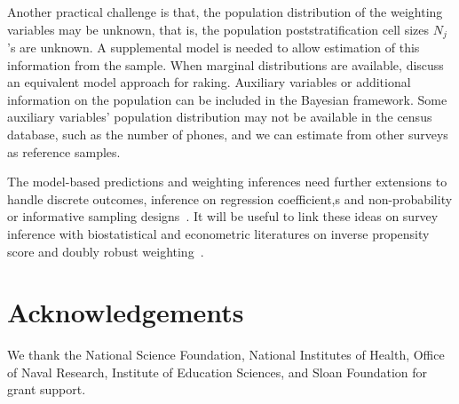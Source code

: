 \documentclass[11pt]{article}
\numberwithin{figure}{section}
\numberwithin{table}{section}
\numberwithin{equation}{section}
\begin{document}
Another practical challenge is that, the population distribution of the
weighting variables may be unknown, that is, the population poststratification
cell sizes $N_j$'s are unknown. A supplemental model is needed to allow
estimation of this information from the sample. When marginal distributions are
available, \cite{rake:little91} discuss an equivalent model approach for
raking. Auxiliary variables or additional information on the population can be
included in the Bayesian framework. Some auxiliary variables' population
distribution may not be available in the census database, such as the number of
phones, and we can estimate from other surveys as reference samples.

The model-based predictions and weighting inferences need further extensions to
handle discrete outcomes, inference on regression coefficient,s and
non-probability or informative sampling designs~\citep{Kim:Skinner:BM13}. It
will be useful to link these ideas on survey inference with biostatistical and
econometric literatures on inverse propensity score and doubly robust
weighting~\citep{kang:schafer07}.

\section*{Acknowledgements} We thank the National Science Foundation, National
Institutes of Health, Office of Naval Research, Institute of Education
Sciences, and Sloan Foundation for grant support.






\pagebreak

\appendix
\end{document}
